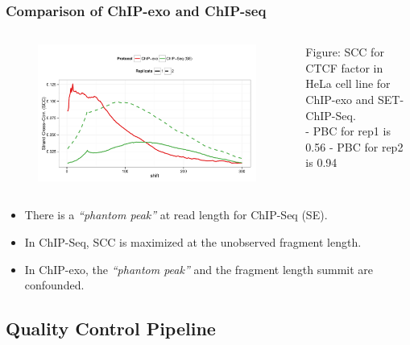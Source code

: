 \documentclass[compress,table,xcolor=dvipsnames]{beamer}\usepackage[]{graphicx}\usepackage[]{color}
\begin{document}
\begin{frame}[t]
  \frametitle{Comparison of ChIP-exo and ChIP-seq}  
\begin{columns}
\begin{figure}[H]
  \centering  
\includegraphics[width = .9\textwidth]{../figs/for_paper/scc_ctcf.pdf}
\end{figure}

  \begin{minipage}[c][.6\textheight][c]{\linewidth}
{\small
  {\color{RoyalBlue}Figure:} SCC for CTCF factor in HeLa cell line for
    ChIP-exo and SET-ChIP-Seq.\\
    - {\color{ForestGreen} PBC for rep1 is 0.56}
    - {\color{ForestGreen} PBC for rep2 is 0.94}
  }
\end{minipage}
\end{columns}

{\small
\begin{itemize}
\item There is a \emph{``phantom peak''} at read length for ChIP-Seq (SE).
\item In ChIP-Seq, SCC is maximized at the unobserved fragment length.
\item In ChIP-exo, the \emph{``phantom peak''} and the fragment length
  summit are confounded.
\end{itemize}
}

\end{frame}

\subsection{Quality Control Pipeline}
\end{document}
